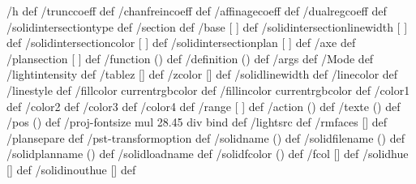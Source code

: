 /h \pst@solides@h\space def %
/trunccoeff \pst@solides@trunccoeff\space def %
/chanfreincoeff \pst@solides@chanfreincoeff\space def %
/affinagecoeff \pst@solides@affinagecoeff\space def %
/dualregcoeff \pst@solides@dualregcoeff\space def %
/solidintersectiontype \pst@solides@intersectiontype\space def %
/section {\pst@solides@section} def %
/base [ \pst@solides@base ] def
/solidintersectionlinewidth [ \pst@solides@intersectionlinewidth ] def
/solidintersectioncolor [ \pst@solides@intersectioncolor ] def
/solidintersectionplan [ \pst@solides@intersectionplan ] def
/axe  { \pst@solides@axe } def
/plansection  [ \pst@solides@plansection ] def
\ifx\pst@solides@function\@empty\else
  /function  (\pst@solides@function) def
\fi
%
/definition  (\pst@solides@definition) def
/args  { \pst@solides@args} def
/Mode \pst@solides@mode\space def %
/lightintensity \pst@solides@lightintensity\space def %
/tablez  [\pst@solides@tablez] def
/zcolor  [\pst@solides@zcolor] def
%
/solidlinewidth {\pst@number\pslinewidth} def
/linecolor  {\pst@usecolor\pslinecolor} def
/linestyle  {\pslinestyle} def
/fillcolor  {\pst@usecolor\psfillcolor currentrgbcolor} def
/fillincolor  {\pst@usecolor\psincolor currentrgbcolor} def
%
/color1 {\pst@usecolor\pscolora } def
/color2 {\pst@usecolor\pscolorb } def
/color3 {\pst@usecolor\pscolorc } def
/color4 {\pst@usecolor\pscolord } def
%
/range [ \pst@solides@range ] def
/action (\pst@solides@action) def
/texte (\pst@solides@text) def
/pos (\pst@solides@pos) def
/proj-fontsize {\pst@solides@fontsize\space \pst@number\psunit mul 28.45 div } bind def
%
\ifx\pst@solides@CoordinatesLight\@empty\else
  /lightsrc {\pst@solides@CoordinatesLight} def
\fi
%
/rmfaces [\pst@solides@CoordinatesRm] def
\ifx\pst@solides@plansepare\@empty\else/plansepare {\pst@solides@plansepare} def\fi
\ifx\pst@solides@transform\@empty\else/pst-transformoption { \pst@solides@transform} def\fi
\ifx\pst@solides@name\@empty\else/solidname (\pst@solides@name) def\fi
\ifx\pst@solides@file\@empty\else/solidfilename (\pst@solides@file) def\fi
\ifx\pst@solides@planname\@empty\else/solidplanname (\pst@solides@planname) def\fi
\ifx\pst@solides@load\@empty\else/solidloadname {\pst@solides@load} def\fi
\ifx\pst@solides@fcolor\@empty\else/solidfcolor (\pst@solides@fcolor) def\fi
%
/fcol [\pst@solides@fcol] def
/solidhue [\pst@solides@hue] def
/solidinouthue [\pst@solides@inouthue] def
